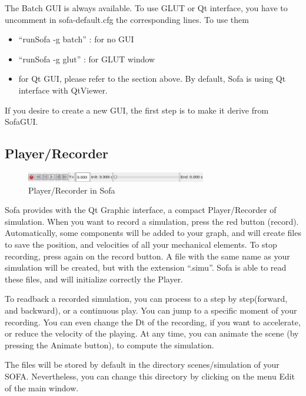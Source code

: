 The Batch GUI is always available. To use GLUT or Qt interface, you have to uncomment in sofa-default.cfg the corresponding lines. To use them
\begin{itemize}
 \item ``runSofa -g batch'' : for no GUI
 \item ``runSofa -g glut'' : for GLUT window 
 \item for Qt GUI, please refer to the section above. By default, Sofa is using Qt interface with QtViewer.
\end{itemize}
If you desire to create a new GUI, the first step is to make it derive from SofaGUI. 






\subsection{Player/Recorder}

\begin{figure}[htpb]
	\centering
		\includegraphics[width=0.7\textwidth]{GUI/GUI_recorder.png}
	\caption{Player/Recorder in Sofa} 	
\end{figure}
Sofa provides with the Qt Graphic interface, a compact Player/Recorder of simulation. When you want to record a simulation, press the red button (record). Automatically, some components will be added to your graph, and will create files to save the position, and velocities of all your mechanical elements. To stop recording, press again on the record button. A file with the same name as your simulation will be created, but with the extension ``.simu''. Sofa is able to read these files, and will initialize correctly the Player. 
\par
To readback a recorded simulation, you can process to a step by step(forward, and backward), or a continuous play. You can jump to a specific moment of your recording. You can even change the Dt of the recording, if you want to accelerate, or reduce the velocity of the playing. At any time, you can animate the scene (by pressing the Animate button), to compute the simulation. 
\par
The files will be stored by default in the directory scenes/simulation of your SOFA. Nevertheless, you can change this directory by clicking on the menu Edit of the main window.







